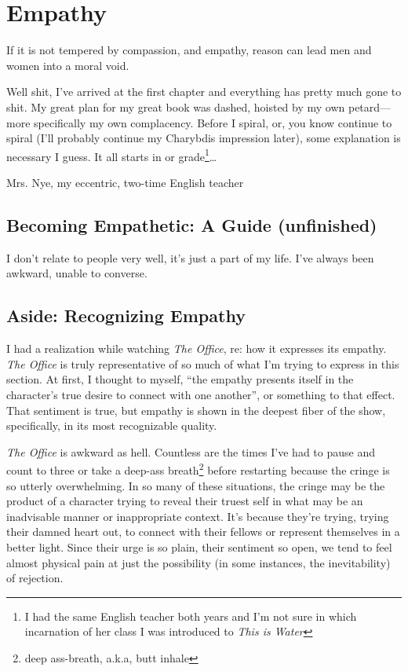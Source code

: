 \documentclass[../butidigress.tex]{subfiles}
\begin{document}
\chapter{Empathy}
\epigraph{If it is not tempered by compassion, and empathy, reason can lead men and women into a moral void.}{}
\newpage

Well shit, I've arrived at the first chapter and everything has pretty much gone to shit.
My great plan for my great book was dashed, hoisted by my own petard---more specifically my own complacency.
Before I spiral, or, you know continue to spiral (I'll probably continue my Charybdis impression later), some explanation is necessary I guess.
It all starts in  or  grade\footnote{I had the same English teacher both years and I'm not sure in which incarnation of her class I was introduced to \textit{This is Water}}\ldots

Mrs. Nye, my eccentric, two-time English teacher

\section{Becoming Empathetic: A Guide (unfinished)}
I don't relate to people very well, it's just a part of my life.
I've always been awkward, unable to converse.

\section{Aside: Recognizing Empathy}
I had a realization while watching \textit{The Office}, re: how it expresses its empathy.
\textit{The Office} is truly representative of so much of what I'm trying to express in this section.
At first, I thought to myself, ``the empathy presents itself in the character's true desire to connect with one another'', or something to that effect.
That sentiment is true, but empathy is shown in the deepest fiber of the show, specifically, in its most recognizable quality.

\textit{The Office} is awkward as hell.
Countless are the times I've had to pause and count to three or take a deep-ass breath\footnote{deep ass-breath, a.k.a, butt inhale} before restarting because the cringe is so utterly overwhelming.
In so many of these situations, the cringe may be the product of a character trying to reveal their truest self in what may be an inadvisable manner or inappropriate context.
It's because they're trying, trying their damned heart out, to connect with their fellows or represent themselves in a better light.
Since their urge is so plain, their sentiment so open, we tend to feel almost physical pain at just the possibility (in some instances, the inevitability) of rejection.
\end{document}

